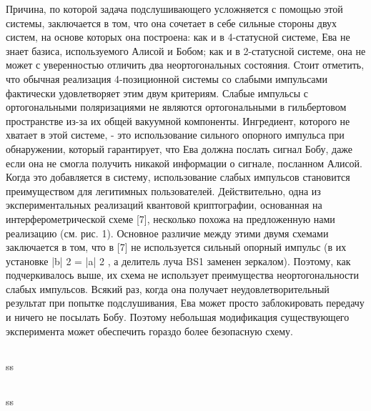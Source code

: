 Причина, по которой задача подслушивающего усложняется с помощью этой системы, заключается в том, что она сочетает в себе сильные стороны двух систем, на основе которых она построена: как и в 4-статусной системе, Ева не знает базиса, используемого Алисой и Бобом; как и в 2-статусной системе, она не может с уверенностью отличить два неортогональных состояния. Стоит отметить, что обычная реализация 4-позиционной системы со слабыми импульсами фактически удовлетворяет этим двум критериям. Слабые импульсы с ортогональными поляризациями не являются ортогональными в гильбертовом пространстве из-за их общей вакуумной компоненты. Ингредиент, которого не хватает в этой системе, - это использование сильного опорного импульса при обнаружении, который гарантирует, что Ева должна послать сигнал Бобу, даже если она не смогла получить никакой информации о сигнале, посланном Алисой. Когда это добавляется в систему, использование слабых импульсов становится преимуществом для легитимных пользователей. Действительно, одна из экспериментальных реализаций квантовой криптографии, основанная на интерферометрической схеме [7], несколько похожа на предложенную нами реализацию (см. рис. 1). Основное различие между этими двумя схемами заключается в том, что в [7] не используется сильный опорный импульс (в их установке |b| 2 = |a| 2 , а делитель луча BS1 заменен зеркалом). Поэтому, как подчеркивалось выше, их схема не использует преимущества неортогональности слабых импульсов. Всякий раз, когда она получает неудовлетворительный результат при попытке подслушивания, Ева может просто заблокировать передачу и ничего не посылать Бобу. Поэтому небольшая модификация существующего эксперимента может обеспечить гораздо более безопасную схему.

\subsection{\review}
ss
\subsection{\dic}
ss